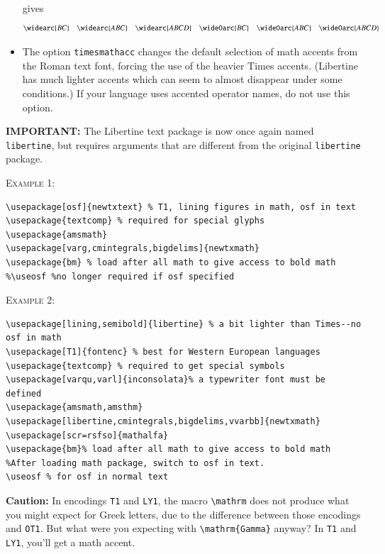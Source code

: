 \documentclass[11pt]{article}
\theoremstyle{oldplain}
\theoremstyle{plain}
\begin{document}
\begin{itemize}
gives
\[\widearc{BC}\quad\widearc{ABC}\quad\widearc{ABCD}\quad
\wideOarc{BC}\quad\wideOarc{ABC}\quad\wideOarc{ABCD}\]
\item The option {\tt timesmathacc} changes the default selection of math accents from the Roman text font, forcing the use of the heavier Times accents. (Libertine has much lighter accents which can seem to almost disappear under some conditions.) If your language uses accented operator names, do not use this option.
\end{itemize}
\bigskip

\textbf{IMPORTANT:} The Libertine text package is now once again named {\tt libertine}, but requires arguments that are different from the original {\tt libertine} package.

\textsc{Example 1:}
\begin{verbatim}
\usepackage[osf]{newtxtext} % T1, lining figures in math, osf in text
\usepackage{textcomp} % required for special glyphs
\usepackage{amsmath}
\usepackage[varg,cmintegrals,bigdelims]{newtxmath}
\usepackage{bm} % load after all math to give access to bold math
%\useosf %no longer required if osf specified
\end{verbatim}
\textsc{Example 2:}
\begin{verbatim}
\usepackage[lining,semibold]{libertine} % a bit lighter than Times--no osf in math
\usepackage[T1]{fontenc} % best for Western European languages
\usepackage{textcomp} % required to get special symbols
\usepackage[varqu,varl]{inconsolata}% a typewriter font must be defined
\usepackage{amsmath,amsthm}
\usepackage[libertine,cmintegrals,bigdelims,vvarbb]{newtxmath}
\usepackage[scr=rsfso]{mathalfa}
\usepackage{bm}% load after all math to give access to bold math
%After loading math package, switch to osf in text.
\useosf % for osf in normal text
\end{verbatim}

\textbf{Caution:} In encodings {\tt T1} and {\tt LY1}, the macro \verb|\mathrm| does not produce what you might expect for Greek letters, due to the difference between those encodings and {\tt OT1}. But what were you expecting with \verb|\mathrm{Gamma}| anyway? In {\tt T1} and {\tt LY1}, you'll get a math accent.
\end{document}
